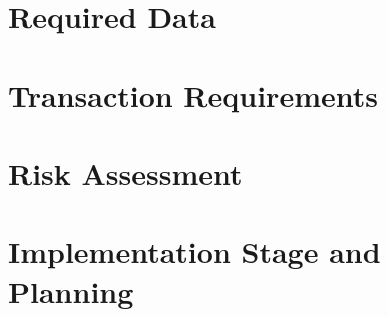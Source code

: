 \chapter{Required Data}


\chapter{Transaction Requirements}


\chapter{Risk Assessment}


\chapter{Implementation Stage and Planning}

